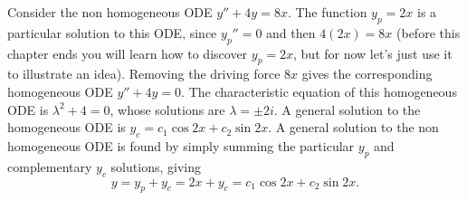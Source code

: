 \begin{example} Consider the non homogeneous ODE $y''+4y = 8x$. The function $y_p=2x$ is a particular solution to this ODE, since $y_p''=0$ and then $4(2x)=8x$ (before this chapter ends you will learn how to discover $y_p=2x$, but for now let's just use it to illustrate an idea). Removing the driving force $8x$ gives the corresponding homogeneous ODE $y''+4y=0$.  The characteristic equation of this homogeneous ODE is $\lambda^2+4=0$, whose solutions are $\lambda =\pm 2i$.  A general solution to the homogeneous ODE is $y_c = c_1 \cos 2x +c_2\sin 2x$. A general solution to the non homogeneous ODE is found by simply summing the particular $y_p$ and complementary $y_c$ solutions, giving $$y = y_p+y_c = 2x+y_c = c_1 \cos 2x +c_2\sin 2x.$$
\end{example}

